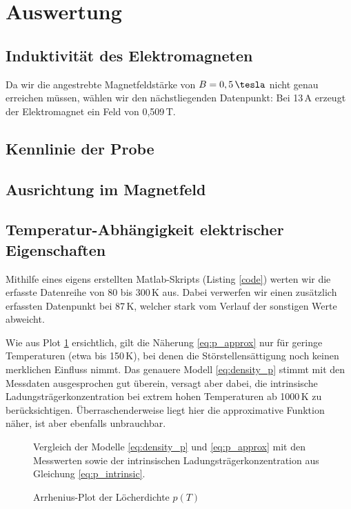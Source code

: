 \newpage
\section{Auswertung}

\subsection{Induktivität des Elektromagneten}


Da wir die angestrebte Magnetfeldstärke von $B = 0,5 \,\tesla$ nicht genau erreichen müssen, wählen wir den nächstliegenden Datenpunkt: Bei 13\,A erzeugt der Elektromagnet ein Feld von 0,509\,T.

\subsection{Kennlinie der Probe}
\subsection{Ausrichtung im Magnetfeld}

\subsection{Temperatur-Abhängigkeit elektrischer Eigenschaften} 
Mithilfe eines eigens erstellten Matlab-Skripts (Listing \ref{code}) werten wir die erfasste Datenreihe von 80 bis 300\,K aus. Dabei verwerfen wir einen zusätzlich erfassten Datenpunkt bei 87\,K, welcher stark vom Verlauf der sonstigen Werte abweicht.

Wie aus Plot \ref{fig:plot_p} ersichtlich, gilt die Näherung \eqref{eq:p_approx} nur für geringe Temperaturen (etwa bis 150\,K), bei denen die Störstellensättigung noch keinen merklichen Einfluss nimmt. Das genauere Modell \eqref{eq:density_p} stimmt mit den Messdaten ausgesprochen gut überein, versagt aber dabei, die intrinsische Ladungsträgerkonzentration bei extrem hohen Temperaturen ab 1000\,K zu berücksichtigen.
Überraschenderweise liegt hier die approximative Funktion näher, ist aber ebenfalls unbrauchbar.

\begin{figure}[p]
\centering
\begin{sideways}

\end{sideways}
\caption{Arrhenius-Plot der Löcherdichte $p(T)$}
\label{fig:plot_p}
\vspace{1ex}
Vergleich der Modelle \eqref{eq:density_p} und \eqref{eq:p_approx} mit den Messwerten sowie der intrinsischen Ladungsträgerkonzentration aus Gleichung \eqref{eq:p_intrinsic}.
\end{figure}


